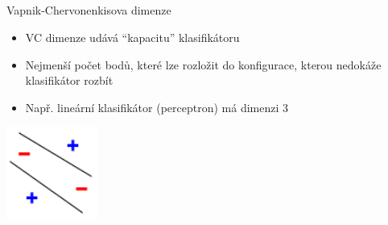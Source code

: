 \documentclass{beamer}
\begin{document}
\subsection{}
\begin{frame}{Vapnik-Chervonenkisova dimenze}
\begin{itemize}
\item VC dimenze udává ``kapacitu'' klasifikátoru
\item Nejmenší počet bodů, které lze rozložit do konfigurace, kterou nedokáže klasifikátor rozbít
\item Např. lineární klasifikátor (perceptron) má dimenzi 3
\end{itemize}
\begin{center}
\includegraphics[height=3cm]{VC4.png}
\end{center}
\end{frame}
\end{document}
